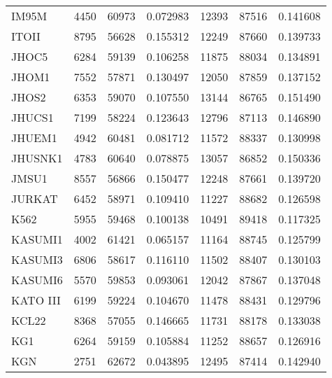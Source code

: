 \begin{tabular}{lrrrrrr}
                                IM95M &      4450 &    60973 &  0.072983 &     12393 &    87516 &  0.141608 \\
                                ITOII &      8795 &    56628 &  0.155312 &     12249 &    87660 &  0.139733 \\
                                JHOC5 &      6284 &    59139 &  0.106258 &     11875 &    88034 &  0.134891 \\
                                JHOM1 &      7552 &    57871 &  0.130497 &     12050 &    87859 &  0.137152 \\
                                JHOS2 &      6353 &    59070 &  0.107550 &     13144 &    86765 &  0.151490 \\
                               JHUCS1 &      7199 &    58224 &  0.123643 &     12796 &    87113 &  0.146890 \\
                               JHUEM1 &      4942 &    60481 &  0.081712 &     11572 &    88337 &  0.130998 \\
                              JHUSNK1 &      4783 &    60640 &  0.078875 &     13057 &    86852 &  0.150336 \\
                                JMSU1 &      8557 &    56866 &  0.150477 &     12248 &    87661 &  0.139720 \\
                               JURKAT &      6452 &    58971 &  0.109410 &     11227 &    88682 &  0.126598 \\
                                 K562 &      5955 &    59468 &  0.100138 &     10491 &    89418 &  0.117325 \\
                              KASUMI1 &      4002 &    61421 &  0.065157 &     11164 &    88745 &  0.125799 \\
                              KASUMI3 &      6806 &    58617 &  0.116110 &     11502 &    88407 &  0.130103 \\
                              KASUMI6 &      5570 &    59853 &  0.093061 &     12042 &    87867 &  0.137048 \\
                             KATO III &      6199 &    59224 &  0.104670 &     11478 &    88431 &  0.129796 \\
                                KCL22 &      8368 &    57055 &  0.146665 &     11731 &    88178 &  0.133038 \\
                                  KG1 &      6264 &    59159 &  0.105884 &     11252 &    88657 &  0.126916 \\
                                  KGN &      2751 &    62672 &  0.043895 &     12495 &    87414 &  0.142940 \\

\end{tabular}
